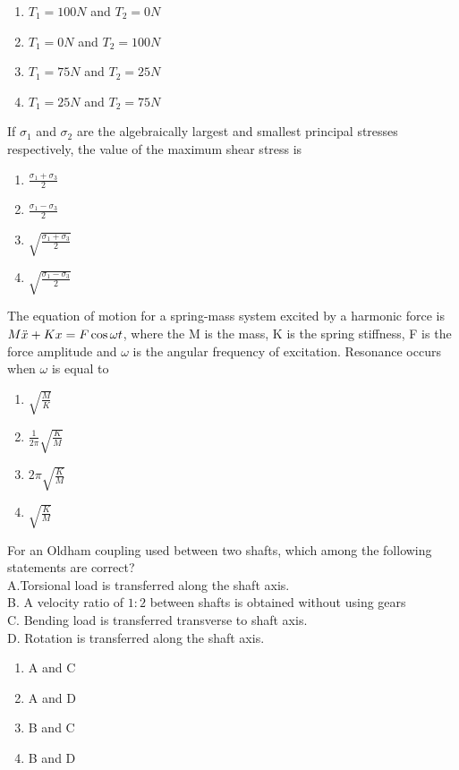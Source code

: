     \begin{enumerate}
        \item $T_1=100N$ and $T_2=0N$
        \item $T_1=0N$ and $T_2=100N$
        \item $T_1=75N$ and $T_2=25N$
        \item $T_1=25N$ and $T_2=75N$
    \end{enumerate}
    \item If $\sigma_1$ and $\sigma_2$ are the algebraically largest and smallest principal stresses respectively, the value of the maximum shear stress is
    \begin{enumerate}
        \item $\frac{\sigma_1+\sigma_3}{2}$
        \item $\frac{\sigma_1-\sigma_3}{2}$
        \item $\sqrt{\frac{\sigma_1+\sigma_3}{2}}$
        \item $\sqrt{\frac{\sigma_1-\sigma_3}{2}}$
    \end{enumerate}
    \item The equation of motion for a spring-mass system excited by a harmonic force is $M\Ddot{x}+Kx=F\cos{\omega t}$, where the M is the mass, K is the spring stiffness, F is the force amplitude and $\omega$ is the angular frequency of excitation. Resonance occurs when $\omega$ is equal to 
    \begin{enumerate}
        \item $\sqrt{\frac{M}{K}}$
        \item $\frac{1}{2\pi}\sqrt{\frac{K}{M}}$
        \item $2\pi\sqrt{\frac{K}{M}}$
        \item $\sqrt{\frac{K}{M}}$
    \end{enumerate}
    \item For an Oldham coupling used between two shafts, which among the following statements are correct?\\
    A.\quad Torsional load is transferred along the shaft axis.\\
    B. \quad A velocity ratio of $1:2$ between shafts is obtained without using gears\\
    C. \quad Bending load is transferred transverse to shaft axis.\\
    D. \quad Rotation is transferred along the shaft axis.
    \begin{enumerate}
        \item A and C
        \item A and D
        \item B and C
        \item B and D
    \end{enumerate}
